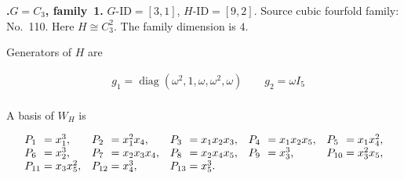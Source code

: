 \documentclass[12pt]{amsart}
\makeatletter
\numberwithin{equation}{section}
\theoremstyle{plain}
\theoremstyle{definition}
\theoremstyle{remark}
\DeclareMathOperator{\diag}{diag}
\newcommand{\PBasisLabel}[1]{\mathrlap{P_{#1}}\phantom{P_{99}}}
\newenvironment{SecEightAlignedBasis}[1]{%
  \begingroup\renewcommand{\arraystretch}{1.18}%
  \[\begin{array}{@{}#1@{}}%
}{\end{array}\]\endgroup}
\newenvironment{familydisplay}{%
  \begingroup
  \setlength{\arraycolsep}{1.35pt}%
  \renewcommand{\arraystretch}{0.96}%
  \setlength{\jot}{2pt}%
}{\endgroup}
\makeatother
\begin{document}
\par{}\medskip\noindent\textbf{.\enspace $G=C_3$, family~1.}\label{fam:threefold-no-27}
$G\text{-ID}=[3,1]$, $H\text{-ID}=[9,2]$.
Source cubic fourfold family: No.~110.  Here
$H\cong C_3^2$.
The family dimension is $4$.
\par\smallskip\noindent Generators of $H$ are\par\nopagebreak
\begin{familydisplay}
\begin{align*}
&g_{1}=\diag(\omega^2,1,\omega,\omega^2,\omega)
\qquad g_{2}=\omega I_5\\
\end{align*}
\end{familydisplay}
\par\smallskip\noindent A basis of $W_H$ is\par\nopagebreak
\begin{familydisplay}
\begin{SecEightAlignedBasis}{l@{\quad}l@{\quad}l@{\quad}l@{\quad}l}
\PBasisLabel{1}=x_{1}^{3}, & \PBasisLabel{2}=x_{1}^{2}x_{4}, & \PBasisLabel{3}=x_{1}x_{2}x_{3}, & \PBasisLabel{4}=x_{1}x_{2}x_{5}, & \PBasisLabel{5}=x_{1}x_{4}^{2},\\
\PBasisLabel{6}=x_{2}^{3}, & \PBasisLabel{7}=x_{2}x_{3}x_{4}, & \PBasisLabel{8}=x_{2}x_{4}x_{5}, & \PBasisLabel{9}=x_{3}^{3}, & \PBasisLabel{10}=x_{3}^{2}x_{5},\\
\PBasisLabel{11}=x_{3}x_{5}^{2}, & \PBasisLabel{12}=x_{4}^{3}, & \multicolumn{3}{@{}l@{}}{\PBasisLabel{13}=x_{5}^{3}.}
\end{SecEightAlignedBasis}
\end{familydisplay}
\end{document}
